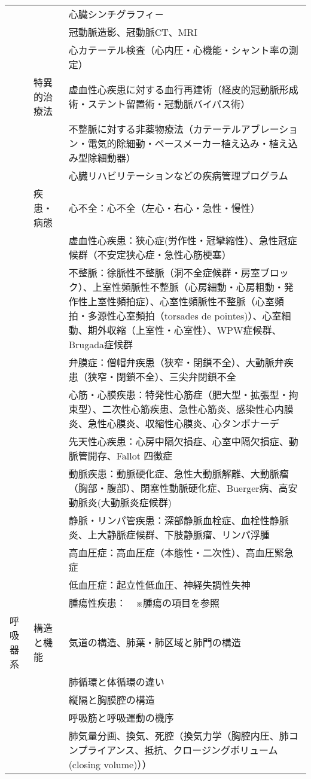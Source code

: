 \begin{xltabular}{\linewidth}{XXX}
 &  & 心臓シンチグラフィ－ \\
 &  & 冠動脈造影、冠動脈CT、MRI \\
 &  & 心カテーテル検査（心内圧・心機能・シャント率の測定） \\
 & 特異的治療法 & 虚血性心疾患に対する血行再建術（経皮的冠動脈形成術・ステント留置術・冠動脈バイパス術） \\
 &  & 不整脈に対する非薬物療法（カテーテルアブレーション・電気的除細動・ペースメーカー植え込み・植え込み型除細動器） \\
 &  & 心臓リハビリテーションなどの疾病管理プログラム \\
 & 疾患・病態 & 心不全：心不全（左心・右心・急性・慢性） \\
 &  & 虚血性心疾患：狭心症(労作性・冠攣縮性）、急性冠症候群（不安定狭心症・急性心筋梗塞） \\
 &  & 不整脈：徐脈性不整脈（洞不全症候群・房室ブロック）、上室性頻脈性不整脈（心房細動・心房粗動・発作性上室性頻拍症）、心室性頻脈性不整脈（心室頻拍・多源性心室頻拍（torsades de pointes)）、心室細動、期外収縮（上室性・心室性）、WPW症候群、Brugada症候群 \\
 &  & 弁膜症：僧帽弁疾患（狭窄・閉鎖不全）、大動脈弁疾患（狭窄・閉鎖不全）、三尖弁閉鎖不全 \\
 &  & 心筋・心膜疾患：特発性心筋症（肥大型・拡張型・拘束型）、二次性心筋疾患、急性心筋炎、感染性心内膜炎、急性心膜炎、収縮性心膜炎、心タンポナーデ \\
 &  & 先天性心疾患：心房中隔欠損症、心室中隔欠損症、動脈管開存、Fallot 四徴症 \\
 &  & 動脈疾患：動脈硬化症、急性大動脈解離、大動脈瘤（胸部・腹部）、閉塞性動脈硬化症、Buerger病、高安動脈炎(大動脈炎症候群) \\
 &  & 静脈・リンパ管疾患：深部静脈血栓症、血栓性静脈炎、上大静脈症候群、下肢静脈瘤、リンパ浮腫 \\
 &  & 高血圧症：高血圧症（本態性・二次性）、高血圧緊急症 \\
 &  & 低血圧症：起立性低血圧、神経失調性失神 \\
 &  & 腫瘍性疾患：　※腫瘍の項目を参照 \\
呼吸器系 & 構造と機能 & 気道の構造、肺葉・肺区域と肺門の構造 \\
 &  & 肺循環と体循環の違い \\
 &  & 縦隔と胸膜腔の構造 \\
 &  & 呼吸筋と呼吸運動の機序 \\
 &  & 肺気量分画、換気、死腔（換気力学（胸腔内圧、肺コンプライアンス、抵抗、クロージングボリューム(closing volume)）） \\

\end{xltabular}

